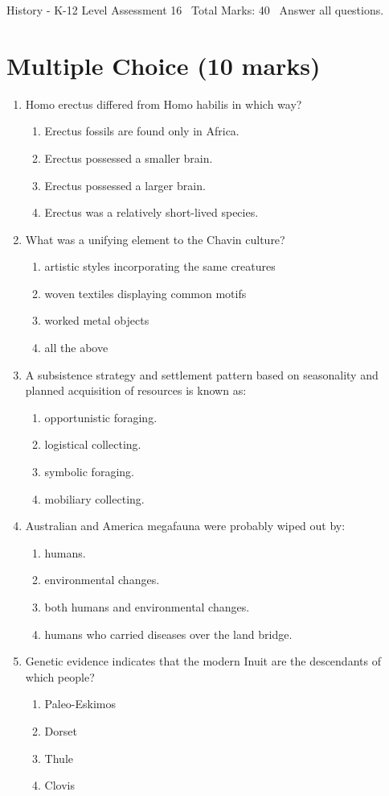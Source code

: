 \documentclass[12pt]{article}
\begin{document}
\begin{center}
History - K-12 Level Assessment 16 \
Total Marks: 40 \
Answer all questions.
\end{center}

\section*{Multiple Choice (10 marks)}
\begin{enumerate}[label=\arabic*.]
\item Homo erectus differed from Homo habilis in which way?
\begin{enumerate}[label=(\alph*)]
    \item Erectus fossils are found only in Africa.
    \item Erectus possessed a smaller brain.
    \item Erectus possessed a larger brain.
    \item Erectus was a relatively short-lived species.
\end{enumerate}
\item What was a unifying element to the Chavin culture?
\begin{enumerate}[label=(\alph*)]
    \item artistic styles incorporating the same creatures
    \item woven textiles displaying common motifs
    \item worked metal objects
    \item all the above
\end{enumerate}
\item A subsistence strategy and settlement pattern based on seasonality and planned acquisition of resources is known as:
\begin{enumerate}[label=(\alph*)]
    \item opportunistic foraging.
    \item logistical collecting.
    \item symbolic foraging.
    \item mobiliary collecting.
\end{enumerate}
\item Australian and America megafauna were probably wiped out by:
\begin{enumerate}[label=(\alph*)]
    \item humans.
    \item environmental changes.
    \item both humans and environmental changes.
    \item humans who carried diseases over the land bridge.
\end{enumerate}
\item Genetic evidence indicates that the modern Inuit are the descendants of which people?
\begin{enumerate}[label=(\alph*)]
    \item Paleo-Eskimos
    \item Dorset
    \item Thule
    \item Clovis
\end{enumerate}
\end{enumerate}
\end{document}
